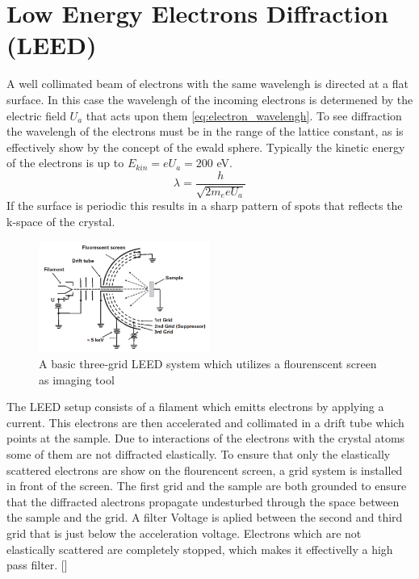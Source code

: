 \newpage

\section{Low Energy Electrons Diffraction (LEED)}
A well collimated beam of electrons with the same wavelengh is directed at a flat surface.
In this case the wavelengh of the incoming electrons is determened by the electric field $U_a$ that acts upon them \ref{eq:electron_wavelengh}.
To see diffraction the wavelengh of the electrons must be in the range of the lattice constant, as is effectively show by the concept of the ewald sphere.
Typically the kinetic energy of the electrons is up to $E_{kin} = e U_a = 200$ eV.
\begin{equation}
    \lambda = \frac{h}{\sqrt{2 m_e e U_a}}
    \label{eq:electron_wavelengh}
\end{equation} 
If the surface is periodic this results in a sharp pattern of spots that reflects the k-space of the crystal.

\begin{figure}
    \centering
    \includegraphics[width=0.5\textwidth]{graphics/fundamental_leed_setup.PNG}
    \caption{A basic three-grid LEED system which utilizes a flourenscent screen as imaging tool \cite{MoritzWolfgang2022SSDb}}
    \label{fig:LEED_Shematics}
\end{figure}

\noindent The LEED setup consists of a filament which emitts electrons by applying a current.
This electrons are then accelerated and collimated in a drift tube which points at the sample.
Due to interactions of the electrons with the crystal atoms some of them are not diffracted elastically.
To ensure that only the elastically scattered electrons are show on the flourencent screen, a grid system is installed in front of the screen.
The first grid and the sample are both grounded to ensure that the diffracted alectrons propagate undesturbed through the space between the sample and the grid.
A filter Voltage is aplied between the second and third grid that is just below the acceleration voltage.
Electrons which are not elastically scattered are completely stopped, which makes it effectivelly a high pass filter. [\cite{MoritzWolfgang2022SSDb}] \\

